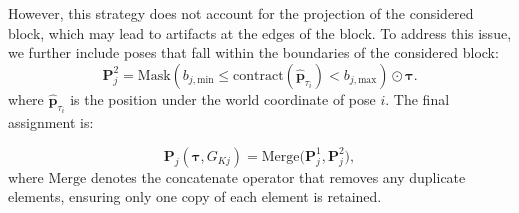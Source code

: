 However, this strategy does not account for the projection of the considered block, which may lead to artifacts at the edges of the block. To address this issue, we further include poses that fall within the boundaries of the considered block:
\begin{equation}
    \mathbf{P}^2_j = \text{Mask}\left(b_{j, \text{min}} \leq \text{contract} (\hat{\mathbf{p}}_{\tau_i}) < b_{j, \text{max}} \right) \odot \boldsymbol{\tau}.
\label{14}
\end{equation}
where $\hat{\mathbf{p}}_{\tau_i}$ is the position under the world coordinate of pose $i$. The final assignment is:


\begin{equation}
    \mathbf{P}_j(\boldsymbol{\tau}, G_{Kj}) = \mathrm{Merge}\bigl(\mathbf{P}^1_j, \mathbf{P}^2_j\bigr),
\end{equation}
where $\mathrm{Merge}$ denotes the concatenate operator that removes any duplicate elements, ensuring only one copy of each element is retained.


